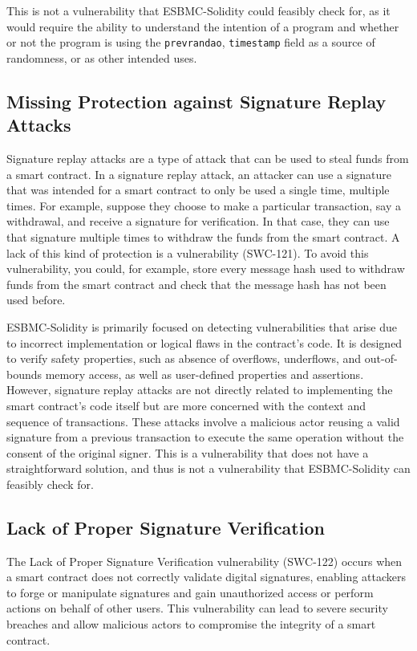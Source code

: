 This is not a vulnerability that ESBMC-Solidity could feasibly check for, as it would require the ability to understand the intention of a program and whether or not the program is using the \verb|prevrandao|, \verb|timestamp| field as a source of randomness, or as other intended uses.

\subsection{Missing Protection against Signature Replay Attacks}
\label{sec:missing_protection_against_signature_replay_attacks}

Signature replay attacks are a type of attack that can be used to steal funds from a smart contract. In a signature replay attack, an attacker can use a signature that was intended for a smart contract to only be used a single time, multiple times. For example, suppose they choose to make a particular transaction, say a withdrawal, and receive a signature for verification. In that case, they can use that signature multiple times to withdraw the funds from the smart contract. A lack of this kind of protection is a vulnerability (SWC-121). To avoid this vulnerability, you could, for example, store every message hash used to withdraw funds from the smart contract and check that the message hash has not been used before.

ESBMC-Solidity is primarily focused on detecting vulnerabilities that arise due to incorrect implementation or logical flaws in the contract's code. It is designed to verify safety properties, such as absence of overflows, underflows, and out-of-bounds memory access, as well as user-defined properties and assertions. However, signature replay attacks are not directly related to implementing the smart contract's code itself but are more concerned with the context and sequence of transactions. These attacks involve a malicious actor reusing a valid signature from a previous transaction to execute the same operation without the consent of the original signer. This is a vulnerability that does not have a straightforward solution, and thus is not a vulnerability that ESBMC-Solidity can feasibly check for.

\subsection{Lack of Proper Signature Verification}
\label{sec:lack_of_proper_signature_verification}

The Lack of Proper Signature Verification vulnerability (SWC-122) occurs when a smart contract does not correctly validate digital signatures, enabling attackers to forge or manipulate signatures and gain unauthorized access or perform actions on behalf of other users. This vulnerability can lead to severe security breaches and allow malicious actors to compromise the integrity of a smart contract.

